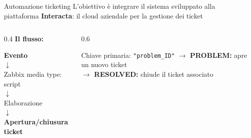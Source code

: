 \documentclass[aspectratio=169]{beamer}
\begin{document}
\begin{frame}{Automazione ticketing}
    L'obiettivo è integrare il sistema sviluppato alla piattaforma \textbf{Interacta}: il cloud aziendale per la gestione dei ticket
    \vspace{0.3cm}
    \begin{columns}
        \begin{column}{0.4\textwidth}
            \textbf{Il flusso:}\\
            \begin{center}
                \textbf{Evento}\\[-0.1cm]
                $\downarrow$\\[-0.1cm]
                Zabbix media type: script\\[-0.1cm]
                $\downarrow$\\[-0.1cm]
                Elaborazione\\[-0.1cm]
                $\downarrow$\\[-0.1cm]
                \textbf{Apertura/chiusura ticket}
            \end{center}
        \end{column}
        \begin{column}{0.6\textwidth}
            \begin{block}{Chiave primaria: \texttt{"problem\_ID"}}
                \vspace{0.3cm}
                $\rightarrow$ \textbf{PROBLEM:} apre un nuovo ticket\\
                \vspace{0.3cm}
                $\rightarrow$ \textbf{RESOLVED:} chiude il ticket associato
                \vspace{0.3cm}

            \end{block}
        \end{column}
    \end{columns}
\end{frame}
\end{document}
